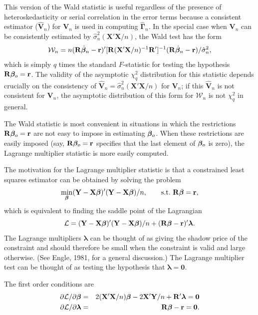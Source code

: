 This version of the Wald statistic is useful regardless of the presence of
heteroskedasticity or serial correlation in the error terms because a consistent estimator ($\hat{\mathbf{V}}_n$) for $\mathbf{V}_n$ is used in computing $\hat{\boldsymbol{\Gamma}}_n$. In the special case
when $\mathbf{V}_n$ can be consistently estimated by $\hat{\sigma}_n^2(\mathbf{X}'\mathbf{X}/n)$, the Wald test has
the form
\[
\mathcal{W}_n = n(\mathbf{R}\hat{\boldsymbol{\beta}}_n - \mathbf{r})'[\mathbf{R}(\mathbf{X}'\mathbf{X}/n)^{-1}\mathbf{R}']^{-1}(\mathbf{R}\hat{\boldsymbol{\beta}}_n - \mathbf{r})/\hat{\sigma}_n^2,
\]
which is simply $q$ times the standard $F$-statistic for testing the hypothesis
$\mathbf{R}\boldsymbol{\beta}_o = \mathbf{r}$. The validity of the asymptotic $\chi_q^2$ distribution for this statistic
depends crucially on the consistency of $\hat{\mathbf{V}}_n = \hat{\sigma}_n^2(\mathbf{X}'\mathbf{X}/n)$ for $\mathbf{V}_n$; if this
$\hat{\mathbf{V}}_n$ is not consistent for $\mathbf{V}_n$, the asymptotic distribution of this form for
$\mathcal{W}_n$ is not $\chi_q^2$ in general.

The Wald statistic is most convenient in situations in which the restrictions $\mathbf{R}\boldsymbol{\beta}_o = \mathbf{r}$ are not easy to impose in estimating $\boldsymbol{\beta}_o$. When these restrictions are easily imposed (say, $\mathbf{R}\boldsymbol{\beta}_o = \mathbf{r}$ specifies that the last element
of $\boldsymbol{\beta}_o$ is zero), the Lagrange multiplier statistic is more easily computed.

The motivation for the Lagrange multiplier statistic is that a constrained
least squares estimator can be obtained by solving the problem
\[
\min_{\boldsymbol{\beta}} (\mathbf{Y} - \mathbf{X}\boldsymbol{\beta})'(\mathbf{Y} - \mathbf{X}\boldsymbol{\beta})/n, \qquad \text{s.t.}\ \mathbf{R}\boldsymbol{\beta} = \mathbf{r},
\]
which is equivalent to finding the saddle point of the Lagrangian
\[
\mathcal{L} = (\mathbf{Y} - \mathbf{X}\boldsymbol{\beta})'(\mathbf{Y} - \mathbf{X}\boldsymbol{\beta})/n + (\mathbf{R}\boldsymbol{\beta} - \mathbf{r})'\boldsymbol{\lambda}.
\]
The Lagrange multipliers $\boldsymbol{\lambda}$ can be thought of as giving the shadow
price of the constraint and should therefore be small when the constraint is
valid and large otherwise. (See Engle, 1981, for a general discussion.) The
Lagrange multiplier test can be thought of as testing the hypothesis that
$\boldsymbol{\lambda} = \mathbf{0}$.

The first order conditions are
\begin{eqnarray*}
\partial \mathcal{L}/\partial \boldsymbol{\beta} &=& 2(\mathbf{X}'\mathbf{X}/n)\boldsymbol{\beta} - 2\mathbf{X}'\mathbf{Y}/n + \mathbf{R}'\boldsymbol{\lambda} = \mathbf{0}\\
\partial \mathcal{L}/\partial \boldsymbol{\lambda} &=& \mathbf{R}\boldsymbol{\beta} - \mathbf{r} = \mathbf{0}.
\end{eqnarray*}

